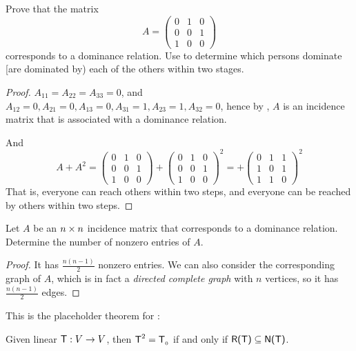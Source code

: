 \begin{exercise} \label{exercise 2.3.23}
Prove that the matrix
\[
    A = \begin{pmatrix}
        0 & 1 & 0 \\
        0 & 0 & 1 \\
        1 & 0 & 0
    \end{pmatrix}
\]
corresponds to a dominance relation.
Use  to determine which persons dominate [are dominated by) each of the others within two stages.
\end{exercise}

\begin{proof}
\(A_{11} = A_{22} = A_{33} = 0\), and \(A_{12} = 0, A_{21} = 0, A_{13} = 0, A_{31} = 1, A_{23} = 1, A_{32} = 0\), hence by , \(A\) is an incidence matrix that is associated with a dominance relation.

And
\[
    A + A^2
    = \begin{pmatrix}
        0 & 1 & 0 \\
        0 & 0 & 1 \\
        1 & 0 & 0
    \end{pmatrix}
    + \begin{pmatrix}
        0 & 1 & 0 \\
        0 & 0 & 1 \\
        1 & 0 & 0
    \end{pmatrix}^2
    = + \begin{pmatrix}
        0 & 1 & 1 \\
        1 & 0 & 1 \\
        1 & 1 & 0
    \end{pmatrix}^2
\]
That is, everyone can reach others within two steps, and everyone can be reached by others within two steps.
\end{proof}

\begin{exercise} \label{exercise 2.3.24}
Let \(A\) be an \(n \times n\) incidence matrix that corresponds to a dominance relation.
Determine the number of nonzero entries of \(A\).
\end{exercise}

\begin{proof}
It has \(\frac{n(n-1)}{2}\) nonzero entries.
We can also consider the corresponding graph of \(A\), which is in fact a \emph{directed complete graph} with \(n\) vertices, so it has \(\frac{n(n-1)}{2}\) edges.
\end{proof}

\begin{additional theorem} \label{athm 2.25}
This is the placeholder theorem for :

Given linear \(\textsf{T} : V \to V\), then \(\textsf{T}^2 = \textsf{T}_{_0}\) if and only if \(\textsf{R(T)} \subseteq \textsf{N(T)}\).
\end{additional theorem}

